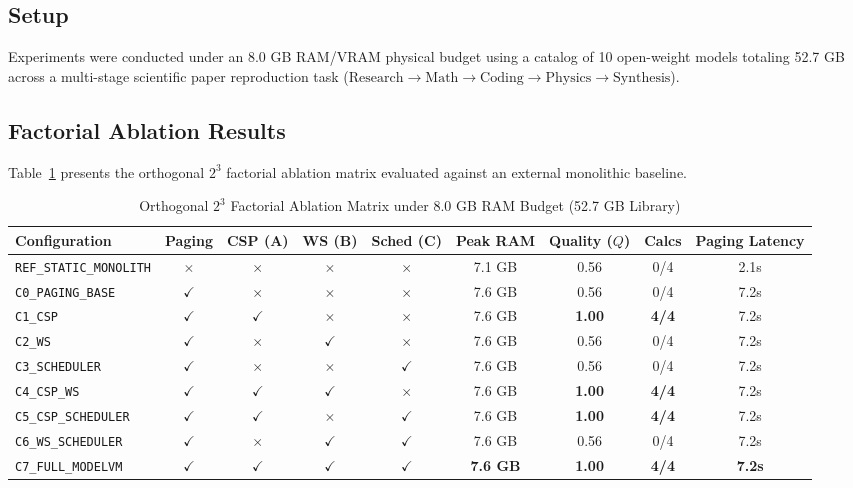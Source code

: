 \documentclass[10pt,twocolumn]{article}
\begin{document}
\subsection{Setup}
Experiments were conducted under an 8.0 GB RAM/VRAM physical budget using a catalog of 10 open-weight models totaling 52.7 GB across a multi-stage scientific paper reproduction task ($\text{Research} \rightarrow \text{Math} \rightarrow \text{Coding} \rightarrow \text{Physics} \rightarrow \text{Synthesis}$).

\subsection{Factorial Ablation Results}

Table~\ref{tab:ablation} presents the orthogonal $2^3$ factorial ablation matrix evaluated against an external monolithic baseline.

\begin{table}[t]
\small
\centering
\caption{Orthogonal $2^3$ Factorial Ablation Matrix under 8.0 GB RAM Budget (52.7 GB Library)}
\label{tab:ablation}
\begin{tabular}{lcccccccc}
\toprule
\textbf{Configuration} & \textbf{Paging} & \textbf{CSP (A)} & \textbf{WS (B)} & \textbf{Sched (C)} & \textbf{Peak RAM} & \textbf{Quality ($Q$)} & \textbf{Calcs} & \textbf{Paging Latency} \\
\midrule
\texttt{REF\_STATIC\_MONOLITH} & $\times$ & $\times$ & $\times$ & $\times$ & 7.1 GB & 0.56 & 0/4 & 2.1s \\
\texttt{C0\_PAGING\_BASE}      & $\checkmark$ & $\times$ & $\times$ & $\times$ & 7.6 GB & 0.56 & 0/4 & 7.2s \\
\texttt{C1\_CSP}              & $\checkmark$ & \textbf{$\checkmark$} & $\times$ & $\times$ & 7.6 GB & \textbf{1.00} & \textbf{4/4} & 7.2s \\
\texttt{C2\_WS}               & $\checkmark$ & $\times$ & \textbf{$\checkmark$} & $\times$ & 7.6 GB & 0.56 & 0/4 & 7.2s \\
\texttt{C3\_SCHEDULER}        & $\checkmark$ & $\times$ & $\times$ & \textbf{$\checkmark$} & 7.6 GB & 0.56 & 0/4 & 7.2s \\
\texttt{C4\_CSP\_WS}          & $\checkmark$ & \textbf{$\checkmark$} & \textbf{$\checkmark$} & $\times$ & 7.6 GB & \textbf{1.00} & \textbf{4/4} & 7.2s \\
\texttt{C5\_CSP\_SCHEDULER}   & $\checkmark$ & \textbf{$\checkmark$} & $\times$ & \textbf{$\checkmark$} & 7.6 GB & \textbf{1.00} & \textbf{4/4} & 7.2s \\
\texttt{C6\_WS\_SCHEDULER}    & $\checkmark$ & $\times$ & \textbf{$\checkmark$} & \textbf{$\checkmark$} & 7.6 GB & 0.56 & 0/4 & 7.2s \\
\texttt{C7\_FULL\_MODELVM}    & $\checkmark$ & \textbf{$\checkmark$} & \textbf{$\checkmark$} & \textbf{$\checkmark$} & \textbf{7.6 GB} & \textbf{1.00} & \textbf{4/4} & \textbf{7.2s} \\
\bottomrule
\end{tabular}
\end{table}
\end{document}
